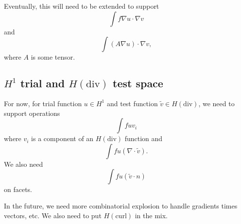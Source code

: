 \documentclass{article}
\begin{document}
Eventually, this will need to be extended to support
\[
\int f \nabla u \cdot \nabla v
\]
and
\[
\int ( A \nabla u ) \cdot \nabla v,
\]
where \( A \) is some tensor.

\subsection{\( H^1 \) trial and \( H(\mathrm{div}) \) test space}
For now, for trial function \( u \in H^1 \) and test function \(
\tilde{v} \in H(\mathrm{div}) \), we need to support operations
\[
\int f u v_i
\]
where \( v_i \) is a component of an \( H(\mathrm{div}) \) function and
\[
\int f u \left( \nabla \cdot \tilde{v} \right).
\]
We also need
\[
\int f u (\tilde{v} \cdot n)
\]
on facets.

In the future, we need more combinatorial explosion to handle
gradients times vectors, etc.  We also need to put \( H(\mathrm{curl})
\) in the mix.
\end{document}
